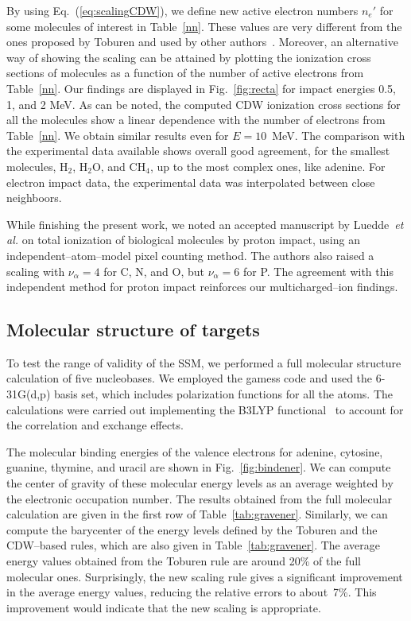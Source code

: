 \documentclass[preprint,showpacs]{revtex4}
\begin{document}
By using Eq.~(\ref{eq:scalingCDW}), we define new active electron 
numbers $n_e'$ for some molecules of interest in Table~\ref{nn}. These 
values are very different from the ones proposed by Toburen and used by 
other authors~\cite{itoh2013}. Moreover, an alternative way of showing 
the scaling can be attained by plotting the ionization cross sections 
of molecules as a function of the number of active electrons from 
Table~\ref{nn}. Our findings are displayed in Fig.~\ref{fig:recta} for 
impact energies 0.5, 1, and 2 MeV. As can be noted, the computed CDW 
ionization cross sections for all the molecules show a linear 
dependence with the number of electrons from Table~\ref{nn}. We obtain 
similar results even for $E=10$~MeV. The comparison with the 
experimental data available shows overall good agreement, for the 
smallest molecules, H$_2$, H$_2$O, and CH$_4$, up to the most complex 
ones, like adenine. For electron impact data, the experimental data was 
interpolated between close neighboors.

While finishing the present work, we noted an accepted manuscript by 
Luedde~{\it et al.} \cite{luedde2019} on total ionization of biological
molecules by proton impact, using an independent--atom--model pixel counting
method. The authors also raised a scaling with $\nu_{\alpha}=4$ 
for C, N, and O, but $\nu_{\alpha}=6$ for P. The agreement with this 
independent method for proton impact reinforces our multicharged--ion findings.

\subsection{Molecular structure of targets}
\label{subsec:molcalculations}

To test the range of validity of the SSM, we performed a full molecular 
structure calculation of five nucleobases. We employed the {\sc gamess} 
code and used the 6-31G(d,p) basis set, which includes polarization 
functions for all the atoms. The calculations were carried out 
implementing the B3LYP functional~\cite{Becke1993,Stephens1994} to 
account for the correlation and exchange effects. 

The molecular binding energies of the valence electrons for adenine, 
cytosine, guanine, thymine, and uracil are shown in Fig.~\ref{fig:bindener}. 
We can compute the center of gravity of these molecular energy levels as 
an average weighted by the electronic occupation number. The results 
obtained from the full molecular calculation are given in the first row
of Table~\ref{tab:gravener}. Similarly, we can compute the barycenter
of the energy levels defined by the Toburen and the CDW--based rules, 
which are also given in Table~\ref{tab:gravener}. The average energy 
values obtained from the Toburen rule are around 20\% of the full 
molecular ones. Surprisingly, the new scaling rule gives a significant 
improvement in the average energy values, reducing the relative errors
to about~7\%. This improvement would indicate that the new 
scaling is appropriate.
\end{document}
